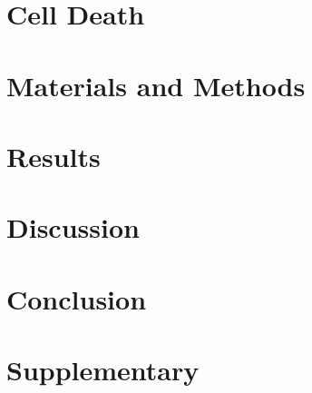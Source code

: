 \documentclass[10pt]{article}
\begin{document}
	\section{Cell Death}
	
	\label{section:Chap_Cell_Death}
	\newpage
	
	\section{Materials and Methods}
	
	\label{section:Chap_Material_and_Methods}
	\newpage
	
	\section{Results}
	
	\label{section:Chap_Results}
	\newpage
	
	\section{Discussion}
	
	\label{section:Chap_Discussion}
	\newpage
	
	\section{Conclusion}
	
	\label{section:Chap_Conclusion}
	\newpage
	
%	
	
	\section*{Supplementary}
	
	\label{section:Chap_Supplementary}
	\newpage
	

	
	
\end{document}
